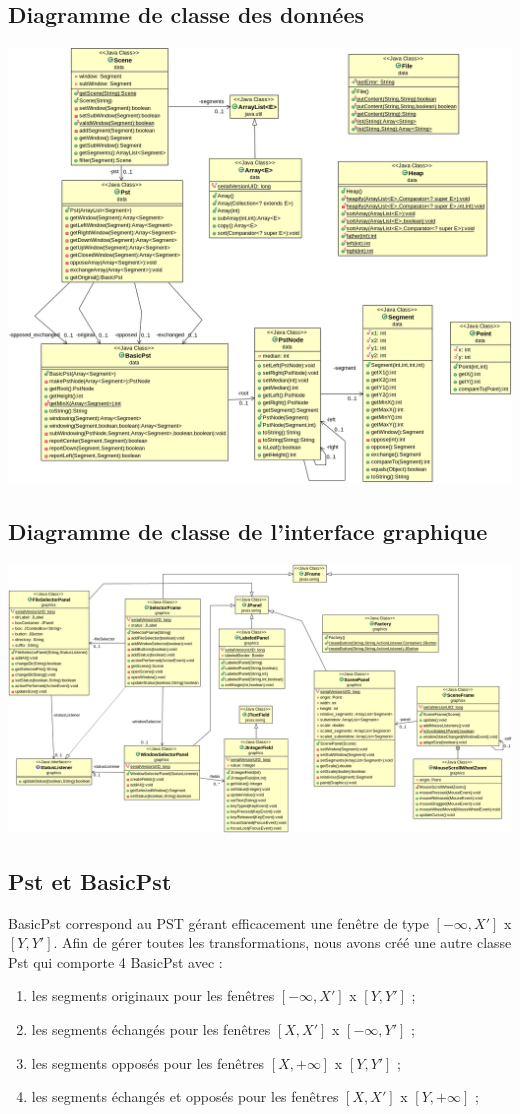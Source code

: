\documentclass[10pt,a4paper]{article}
\begin{document}
\subsection{Diagramme de classe des données}
\includegraphics[scale=0.35]{../src/UML/data.png}

\subsection{Diagramme de classe de l'interface graphique}
\includegraphics[scale=0.25]{../src/UML/graphics.png}

\subsection{Pst et BasicPst}
BasicPst correspond au PST gérant efficacement une fenêtre de type $[-\infty, X']$ x $[Y, Y']$. Afin de gérer toutes les transformations, nous avons créé une autre classe Pst qui comporte 4 BasicPst avec :
\begin{enumerate}
	\item les segments originaux pour les fenêtres $[-\infty, X']$ x $[Y, Y']$ ;
	\item les segments échangés pour les fenêtres $[X, X']$ x $[-\infty, Y']$ ;
	\item les segments opposés pour les fenêtres $[X, +\infty]$ x $[Y, Y']$ ;
	\item les segments échangés et opposés pour les fenêtres $[X, X']$ x $[Y, +\infty]$ ;
\end{enumerate}
\end{document}
